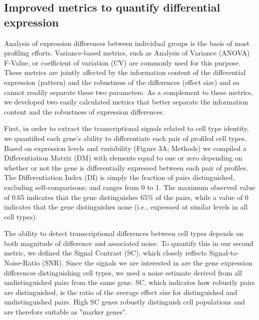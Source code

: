 \subsection{Improved metrics to quantify differential expression}

Analysis of expression differences between individual groups is the basis of most profiling efforts. Variance-based metrics, such as Analysis of Variance (ANOVA) F-Value, or coefficient of variation (CV) are commonly used for this purpose. These metrics are jointly affected by the information content of the differential expression (pattern) and the robustness of the differences (effect size) and so cannot readily separate these two parameters. As a complement to these metrics, we developed two easily calculated metrics that better separate the information content and the robustness of expression differences. 

First, in order to extract the transcriptional signals related to cell type identity, we quantified each gene's ability to differentiate each pair of profiled cell types. Based on expression levels and variability (Figure 3A; Methods) we compiled a Differentiation Matrix (DM) with elements equal to one or zero depending on whether or not the gene is differentially expressed between each pair of profiles. The Differentiation Index (DI) is simply the fraction of pairs distinguished, excluding self-comparisons; and ranges from 0 to 1. The maximum observed value of 0.65 indicates that the gene distinguishes 65\% of the pairs, while a value of 0 indicates that the gene distinguishes none (i.e., expressed at similar levels in all cell types).

The ability to detect transcriptional differences between cell types depends on both magnitude of difference and associated noise. To quantify this in our second metric, we defined the Signal Contrast (SC), which closely reflects Signal-to-Noise-Ratio (SNR). Since the signals we are interested in are the gene expression differences distinguishing cell types, we used a noise estimate derived from all undistinguished pairs from the same gene. SC, which indicates how robustly pairs are distinguished, is the ratio of the average effect size for distinguished and undistinguished pairs. High SC genes robustly distinguish cell populations and are therefore suitable as "marker genes". 

